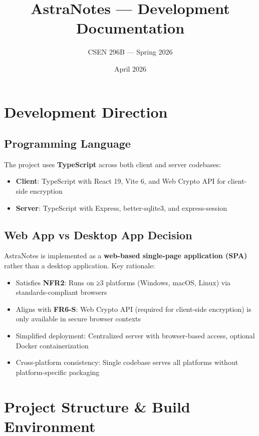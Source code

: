 \documentclass[11pt,a4paper]{article}
\title{AstraNotes — Development Documentation}
\author{CSEN 296B — Spring 2026}
\date{April 2026}
\begin{document}
\maketitle

\section{Development Direction}
\subsection{Programming Language}
The project uses \textbf{TypeScript} across both client and server codebases:
\begin{itemize}
  \item \textbf{Client}: TypeScript with React 19, Vite 6, and Web Crypto API for client-side encryption
  \item \textbf{Server}: TypeScript with Express, better-sqlite3, and express-session
\end{itemize}

\subsection{Web App vs Desktop App Decision}
AstraNotes is implemented as a \textbf{web-based single-page application (SPA)} rather than a desktop application. Key rationale:
\begin{itemize}
  \item Satisfies \textbf{NFR2}: Runs on ≥3 platforms (Windows, macOS, Linux) via standards-compliant browsers
  \item Aligns with \textbf{FR6-S}: Web Crypto API (required for client-side encryption) is only available in secure browser contexts
  \item Simplified deployment: Centralized server with browser-based access, optional Docker containerization
  \item Cross-platform consistency: Single codebase serves all platforms without platform-specific packaging
\end{itemize}

\section{Project Structure \& Build Environment}
\end{document}

